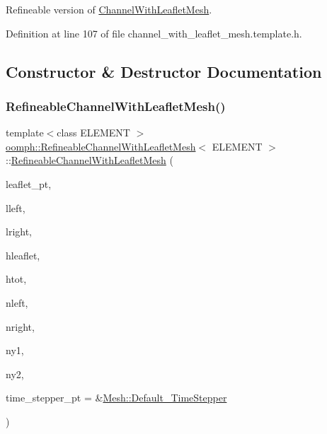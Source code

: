 Refineable version of \hyperlink{classoomph_1_1ChannelWithLeafletMesh}{Channel\+With\+Leaflet\+Mesh}. 

Definition at line 107 of file channel\+\_\+with\+\_\+leaflet\+\_\+mesh.\+template.\+h.



\subsection{Constructor \& Destructor Documentation}
\mbox{\label{classoomph_1_1RefineableChannelWithLeafletMesh_a9af91f13b3fd683029e2bdfbfe3abd66}} 
\subsubsection{\texorpdfstring{Refineable\+Channel\+With\+Leaflet\+Mesh()}{RefineableChannelWithLeafletMesh()}}
{\footnotesize\ttfamily template$<$class E\+L\+E\+M\+E\+NT $>$ \\
\hyperlink{classoomph_1_1RefineableChannelWithLeafletMesh}{oomph\+::\+Refineable\+Channel\+With\+Leaflet\+Mesh}$<$ E\+L\+E\+M\+E\+NT $>$\+::\hyperlink{classoomph_1_1RefineableChannelWithLeafletMesh}{Refineable\+Channel\+With\+Leaflet\+Mesh} (\begin{DoxyParamCaption}\item[{\hyperlink{classoomph_1_1GeomObject}{Geom\+Object} $\ast$}]{leaflet\+\_\+pt,  }\item[{const double \&}]{lleft,  }\item[{const double \&}]{lright,  }\item[{const double \&}]{hleaflet,  }\item[{const double \&}]{htot,  }\item[{const unsigned \&}]{nleft,  }\item[{const unsigned \&}]{nright,  }\item[{const unsigned \&}]{ny1,  }\item[{const unsigned \&}]{ny2,  }\item[{\hyperlink{classoomph_1_1TimeStepper}{Time\+Stepper} $\ast$}]{time\+\_\+stepper\+\_\+pt = {\ttfamily \&\hyperlink{classoomph_1_1Mesh_a12243d0fee2b1fcee729ee5a4777ea10}{Mesh\+::\+Default\+\_\+\+Time\+Stepper}} }\end{DoxyParamCaption})\hspace{0.3cm}{\ttfamily [inline]}}



